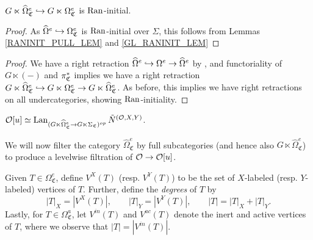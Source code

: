 \documentclass[a4paper,10pt
,draft
]{article}%
\renewcommand{\hat}{\widehat}
\renewcommand{\1}{\eta}%
\newcommand{\SC}{\Sigma_{\mathfrak C}}
\newcommand{\OC}{\Omega_{\mathfrak C}}
\begin{document}
\begin{lemma}
      $G \ltimes \hat\Omega_{\mathfrak C}^e \into G \ltimes \OC^e$ is $\operatorname{Ran}$-initial.
\end{lemma}
\begin{proof}
      As $\hat\Omega^e \into \OC^e$ is $\operatorname{Ran}$-initial over $\Sigma$, this follows from Lemmas \ref{RANINIT_PULL_LEM} and \ref{GL_RANINIT_LEM}
\end{proof}
\begin{proof}
      We have a right retraction $\hat \Omega^e \into \Omega^e \to \hat \Omega^e$
      by \cite[Prop. 5.49]{BP_geo},
      and functoriality of $G \ltimes (-)$ and $\pi_{\mathfrak C}^{\**}$ implies
      we have a right retraction
      $G \ltimes \hat \Omega_{\mathfrak C}^e \into G \ltimes \OC^e \to G \ltimes \hat \Omega_{\mathfrak C}^e$.
      As before, this implies we have right retractions on all undercategories, showing $\operatorname{Ran}$-initiality.
\end{proof}

\begin{proposition}
      \label{OU_RED3_PROP}
      $\O[u] \simeq \Lan_{(G \ltimes \hat\Omega_{\mathfrak C}^{e} \to G \ltimes \SC)^{op}} \tilde N^{(\O,X,Y)}$. 
\end{proposition}

We will now filter the category $\hat\Omega_{\mathfrak C}^e$ by full subcategories (and hence also $G \ltimes \hat \Omega_{\mathfrak C}^e$)
to produce a levelwise filtration of $\mathcal{O} \to \mathcal{O}[u]$.

\begin{definition}
      Given $T \in \OC^e$, define
      $V^X(T)$ (resp. $V^Y(T)$) to be the set of $X$-labeled (resp. $Y$-labeled) vertices of $T$.
      Further, define the \textit{degrees} of $T$ by
      \begin{equation}
            |T|_X = |V^X(T)|,
            \qquad
            |T|_Y = |V^Y(T)|,
            \qquad
            |T| = |T|_X + |T|_Y.
      \end{equation}
      Lastly, for $T \in \OC^a$, let $V^{in}(T)$ and $V^{ac}(T)$ denote the inert and active vertices of $T$,
      where we observe that $|T| = |V^{in}(T)|$.
\end{definition}
\end{document}
